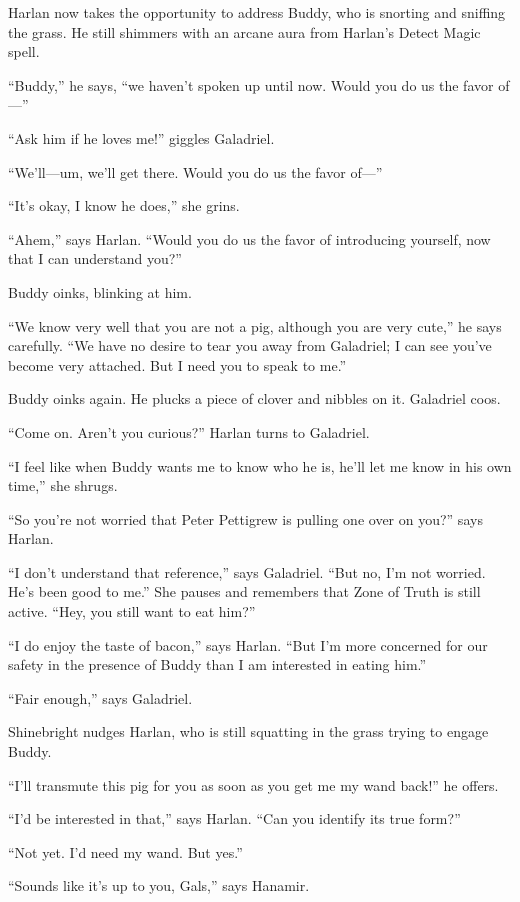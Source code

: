 \documentclass[smalldemyvopaper,11pt,twoside,onecolumn,openright,extrafontsizes]{memoir}
\begin{document}
Harlan now takes the opportunity to address Buddy, who is snorting and
sniffing the grass. He still shimmers with an arcane aura from Harlan's
Detect Magic spell.

``Buddy,'' he says, ``we haven't spoken up until now. Would you do us
the favor of---''

``Ask him if he loves me!'' giggles Galadriel.

``We'll---um, we'll get there. Would you do us the favor of---''

``It's okay, I know he does,'' she grins.

``Ahem,'' says Harlan. ``Would you do us the favor of introducing
yourself, now that I can understand you?''

Buddy oinks, blinking at him.

``We know very well that you are not a pig, although you are very
cute,'' he says carefully. ``We have no desire to tear you away from
Galadriel; I can see you've become very attached. But I need you to
speak to me.''

Buddy oinks again. He plucks a piece of clover and nibbles on it.
Galadriel coos.

``Come on. Aren't you curious?'' Harlan turns to Galadriel.

``I feel like when Buddy wants me to know who he is, he'll let me know
in his own time,'' she shrugs.

``So you're not worried that Peter Pettigrew is pulling one over on
you?'' says Harlan.

``I don't understand that reference,'' says Galadriel. ``But no, I'm not
worried. He's been good to me.'' She pauses and remembers that Zone of
Truth is still active. ``Hey, you still want to eat him?''

``I do enjoy the taste of bacon,'' says Harlan. ``But I'm more concerned
for our safety in the presence of Buddy than I am interested in eating
him.''

``Fair enough,'' says Galadriel.

Shinebright nudges Harlan, who is still squatting in the grass trying to
engage Buddy.

``I'll transmute this pig for you as soon as you get me my wand back!''
he offers.

``I'd be interested in that,'' says Harlan. ``Can you identify its true
form?''

``Not yet. I'd need my wand. But yes.''

``Sounds like it's up to you, Gals,'' says Hanamir.
\end{document}
